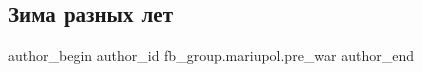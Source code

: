  
 
 
 
 

\subsection{Зима разных лет}
\label{sec:17_02_2023.fb.fb_group.mariupol.pre_war.4.zima_raznikh_let}

\ifcmt
 author_begin
   author_id fb_group.mariupol.pre_war
 author_end
\fi
